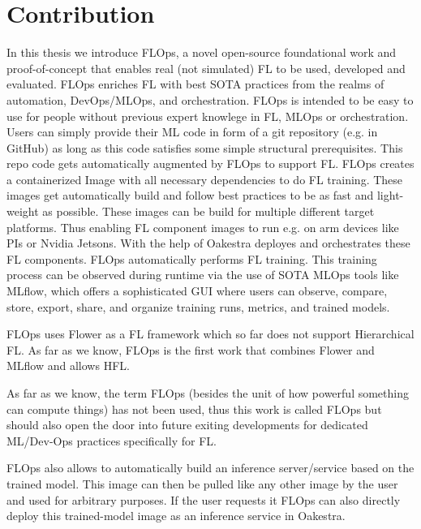 
\section{Contribution}
In this thesis we introduce FLOps, a novel open-source foundational work and proof-of-concept
that enables real (not simulated) FL to be used, developed and evaluated.
FLOps enriches FL with best SOTA practices from the realms of automation, DevOps/MLOps, and orchestration.
FLOps is intended to be easy to use for people without previous expert knowlege in FL, MLOps or orchestration.
Users can simply provide their ML code in form of a git repository (e.g. in GitHub)
as long as this code satisfies some simple structural prerequisites.
This repo code gets automatically augmented by FLOps to support FL.
FLOps creates a containerized Image with all necessary dependencies to do FL training.
These images get automatically build and follow best practices to be as fast and light-weight as possible.
These images can be build for multiple different target platforms.
Thus enabling FL component images to run e.g. on arm devices like PIs or Nvidia Jetsons.
With the help of Oakestra deployes and orchestrates these FL components.
FLOps automatically performs FL training.
This training process can be observed during runtime via the use of SOTA MLOps tools like MLflow,
which offers a sophisticated GUI where users can observe, compare, store, export, share, and organize training runs, metrics, and trained models.

FLOps uses Flower as a FL framework which so far does not support Hierarchical FL.
As far as we know, FLOps is the first work that combines Flower and MLflow and allows HFL.

As far as we know, the term FLOps (besides the unit of how powerful something can compute things)
has not been used, thus this work is called FLOps but should also open the door into future exiting
developments for dedicated ML/Dev-Ops practices specifically for FL.

FLOps also allows to automatically build an inference server/service based on the trained model.
This image can then be pulled like any other image by the user and used for arbitrary purposes.
If the user requests it FLOps can also directly deploy this trained-model image as an inference service in Oakestra.

